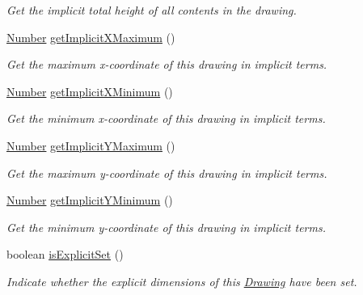 \begin{DoxyCompactItemize}
\begin{DoxyCompactList}\small\item\em Get the implicit total height of all contents in the drawing. \end{DoxyCompactList}\item 
\hyperlink{interfacecom_1_1aarrelaakso_1_1drawl_1_1_number}{Number} \hyperlink{classcom_1_1aarrelaakso_1_1drawl_1_1_drawing_a5376328fce5b40696338490ab5b65bfe}{get\+Implicit\+X\+Maximum} ()
\begin{DoxyCompactList}\small\item\em Get the maximum x-\/coordinate of this drawing in implicit terms. \end{DoxyCompactList}\item 
\hyperlink{interfacecom_1_1aarrelaakso_1_1drawl_1_1_number}{Number} \hyperlink{classcom_1_1aarrelaakso_1_1drawl_1_1_drawing_a481640a0219881863f0150b5f6439e38}{get\+Implicit\+X\+Minimum} ()
\begin{DoxyCompactList}\small\item\em Get the minimum x-\/coordinate of this drawing in implicit terms. \end{DoxyCompactList}\item 
\hyperlink{interfacecom_1_1aarrelaakso_1_1drawl_1_1_number}{Number} \hyperlink{classcom_1_1aarrelaakso_1_1drawl_1_1_drawing_a604c7e5fd692a279380aa2cd8c47a9bc}{get\+Implicit\+Y\+Maximum} ()
\begin{DoxyCompactList}\small\item\em Get the maximum y-\/coordinate of this drawing in implicit terms. \end{DoxyCompactList}\item 
\hyperlink{interfacecom_1_1aarrelaakso_1_1drawl_1_1_number}{Number} \hyperlink{classcom_1_1aarrelaakso_1_1drawl_1_1_drawing_a6bd98f6bb8616668329f07705f8f3689}{get\+Implicit\+Y\+Minimum} ()
\begin{DoxyCompactList}\small\item\em Get the minimum y-\/coordinate of this drawing in implicit terms. \end{DoxyCompactList}\item 
boolean \hyperlink{classcom_1_1aarrelaakso_1_1drawl_1_1_drawing_ab5e45e49b01dc01733156f2bd3e917ea}{is\+Explicit\+Set} ()
\begin{DoxyCompactList}\small\item\em Indicate whether the explicit dimensions of this \hyperlink{classcom_1_1aarrelaakso_1_1drawl_1_1_drawing}{Drawing} have been set. \end{DoxyCompactList}\item 

\end{DoxyCompactItemize}
